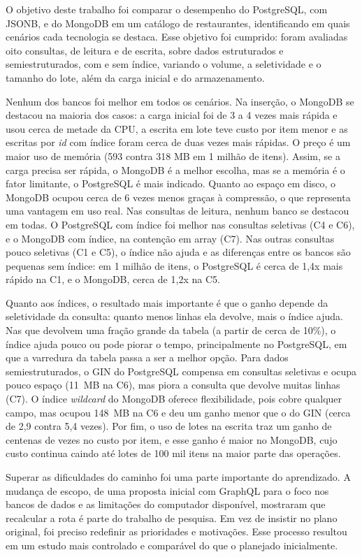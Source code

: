 O objetivo deste trabalho foi comparar o desempenho do PostgreSQL, com JSONB, e do
MongoDB em um catálogo de restaurantes, identificando em quais cenários cada
tecnologia se destaca. Esse objetivo foi cumprido: foram avaliadas oito consultas,
de leitura e de escrita, sobre dados estruturados e semiestruturados, com e sem
índice, variando o volume, a seletividade e o tamanho do lote, além da carga inicial
e do armazenamento.

Nenhum dos bancos foi melhor em todos os cenários. Na inserção, o MongoDB se
destacou na maioria dos casos: a carga inicial foi de 3 a 4 vezes mais rápida e usou
cerca de metade da CPU, a escrita em lote teve custo por item menor e as escritas por
\textit{id} com índice foram cerca de duas vezes mais rápidas. O preço é um maior uso
de memória (593 contra 318 MB em 1 milhão de itens). Assim, se a carga precisa ser
rápida, o MongoDB é a melhor escolha, mas se a
memória é o fator limitante, o PostgreSQL é mais indicado. Quanto ao espaço em
disco, o MongoDB ocupou cerca de 6 vezes menos graças à compressão, o que representa
uma vantagem em uso real. Nas consultas de leitura, nenhum banco se destacou em todas. 
O PostgreSQL com índice
foi melhor nas consultas seletivas (C4 e C6), e o MongoDB com índice, na contenção
em array (C7). Nas outras consultas pouco seletivas (C1 e C5), o índice não ajuda e as diferenças
entre os bancos são pequenas sem índice: em 1 milhão de itens, o PostgreSQL é cerca de 1,4x mais rápido na
C1, e o MongoDB, cerca de 1,2x na C5.

Quanto aos índices, o resultado mais importante é que o ganho depende da
seletividade da consulta: quanto menos linhas ela devolve, mais o índice ajuda.
Nas que devolvem uma fração grande da tabela (a partir de cerca de 10\%), 
o índice ajuda pouco ou pode piorar o tempo, principalmente no PostgreSQL, 
em que a varredura da tabela passa a ser a melhor opção.
Para dados semiestruturados, o GIN do PostgreSQL compensa em consultas seletivas e ocupa pouco
espaço (11~MB na C6), mas piora a consulta que devolve muitas linhas (C7). O índice
\textit{wildcard} do MongoDB oferece flexibilidade, pois cobre qualquer campo, mas
ocupou 148~MB na C6 e deu um ganho menor
que o do GIN (cerca de 2,9 contra 5,4 vezes). Por fim, o uso de lotes na escrita traz 
um ganho de centenas de vezes no custo por
item, e esse ganho é maior no MongoDB, cujo custo continua caindo até lotes de 100
mil itens na maior parte das operações.

Superar as dificuldades do caminho foi uma parte importante do aprendizado. A mudança
de escopo, de uma proposta inicial com GraphQL para o foco nos bancos de dados e as
limitações do computador disponível, mostraram que recalcular a rota é parte do 
trabalho de pesquisa. Em vez de
insistir no plano original, foi preciso redefinir as prioridades e motivações. 
Esse processo resultou em um estudo mais controlado e
comparável do que o planejado inicialmente.

